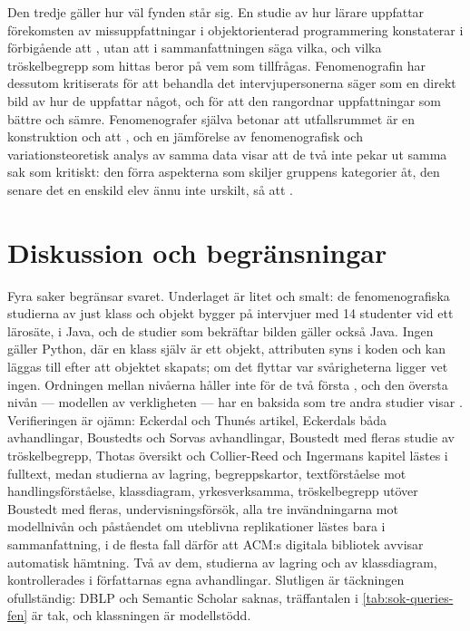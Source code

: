 Den tredje gäller hur väl fynden står sig.  En studie av hur lärare
uppfattar förekomsten av missuppfattningar i objektorienterad
programmering konstaterar i förbigående att
, utan att i sammanfattningen säga vilka, och vilka
tröskelbegrepp som hittas beror på vem som tillfrågas\autocite{%
ShenEtAl2026}.  Fenomenografin har dessutom kritiserats för att
behandla det intervjupersonerna säger som en direkt bild av hur de
uppfattar något, och för att den rangordnar uppfattningar som bättre och
sämre\autocite[104--105]{Sorva2012VPS}.  Fenomenografer själva betonar
att utfallsrummet är en konstruktion och att
, och en
jämförelse av fenomenografisk och variationsteoretisk analys av samma
data visar att de två inte pekar ut samma sak som kritiskt: den förra
aspekterna som skiljer gruppens kategorier åt, den senare det en enskild
elev ännu inte urskilt, så att .

\section{Diskussion och begränsningar}
\label{sec:fen-diskussion}

Fyra saker begränsar svaret.  Underlaget är litet och smalt: de
fenomenografiska studierna av just klass och objekt bygger på intervjuer
med 14 studenter vid ett lärosäte, i Java, och de studier som bekräftar
bilden gäller också Java.  Ingen gäller Python, där en klass själv är ett
objekt, attributen syns i koden och kan läggas till efter att objektet
skapats; om det flyttar var svårigheterna ligger vet ingen.  Ordningen
mellan nivåerna håller inte för de två första
\autocite{Eckerdal2011TextAction}, och den översta nivån --- modellen av
verkligheten --- har en baksida som tre andra studier visar
\autocite{TeifHazzan2006,Liberman2011,Hadar2013}.  Verifieringen är
ojämn: Eckerdal och Thunés artikel, Eckerdals båda avhandlingar,
Boustedts och Sorvas avhandlingar, Boustedt med fleras studie av
tröskelbegrepp, Thotas översikt och Collier-Reed och Ingermans kapitel
lästes i fulltext, medan studierna av lagring, begreppskartor,
textförståelse mot handlingsförståelse, klassdiagram, yrkesverksamma,
tröskelbegrepp utöver Boustedt med fleras, undervisningsförsök, alla tre
invändningarna mot modellnivån och påståendet om uteblivna replikationer
lästes bara i sammanfattning, i de flesta fall därför att ACM:s digitala
bibliotek avvisar automatisk hämtning.  Två av dem, studierna av lagring
och av klassdiagram, kontrollerades i författarnas egna avhandlingar.
Slutligen är täckningen ofullständig: DBLP och Semantic Scholar saknas,
träffantalen i \cref{tab:sok-queries-fen} är tak, och klassningen är
modellstödd.

